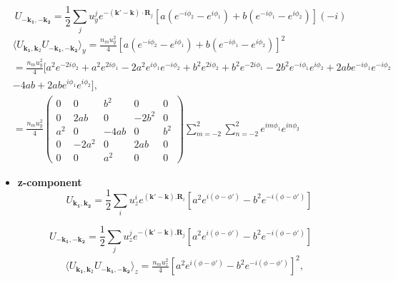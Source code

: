 \documentclass[aps,prb,amsmath,amssymb,footinbib,showpacs,twocolumn]{revtex4-2}
\begin{document}
\begin{widetext}
\begin{equation}
\end{equation}
\begin{equation}
     U_{\mathbf{-k_{1},-k_{2}}}   = \frac{1}{2}\sum_{j}u^{j}_{y}e^{-(\mathbf{k'-k})\cdot\mathbf{R}_{j}}\left[a(e^{-i\phi_{2}}-e^{i\phi_{1}})+b(e^{-i\phi_{1}}-e^{i\phi_{2}})\right](-i)
\end{equation}
\begin{align}
    &\langle U_{\mathbf{k_1},\mathbf{k}_{2}}U_{\mathbf{-k_1},\mathbf{-k_2}}\bigl \rangle_{y}= \frac{n_{m}u^{2}_{y}}{4}\left[a(e^{-i\phi_{2}}-e^{i\phi_{1}})+b(e^{-i\phi_{1}}-e^{i\phi_{2}})\right]^{2}\nonumber\\&
    =\frac{n_{m}u^{2}_{y}}{4}[a^{2}e^{-2i\phi_{2}}+a^{2}e^{2i\phi_{1}}-2a^{2}e^{i\phi_{1}}e^{-i\phi_{2}}+b^{2}e^{2i\phi_{2}}+b^{2}e^{-2i\phi_{1}}-2b^{2}e^{-i\phi_{1}}e^{i\phi_{2}}+2abe^{-i\phi_{1}}e^{-i\phi_{2}}\nonumber\\&
    -4ab+2abe^{i\phi_{1}}e^{i\phi_{2}}],\nonumber \\&
    = \frac{n_{m}u^{2}_{y}}{4}\begin{pmatrix}
 0 & 0 & b^{2} & 0 & 0\\
        0 & 2ab & 0 & -2b^{2} & 0 \\
        a^{2} & 0 & -4ab & 0 & b^{2} \\
        0 & -2a^{2} & 0 & 2ab & 0\\
       0 & 0 & a^{2} & 0 & 0
\end{pmatrix}\sum_{m=-2}^{2}\sum_{n=-2}^{2}e^{im\phi_{1}}e^{in\phi_{2}}
\end{align}
\begin{itemize}
    \item \textbf{z-component}
    \begin{equation}
    U_{\mathbf{k_{1},k_{2}}}    = \frac{1}{2}\sum_{i}u^{i}_{z}e^{(\mathbf{k'-k}).\mathbf{R}_{i}}\left[a^{2}e^{i(\phi-\phi')}-b^{2}e^{-i(\phi-\phi')}\right]  
    \end{equation}
\end{itemize}
\begin{equation}
     U_{\mathbf{-k_{1},-k_{2}}}    = \frac{1}{2}\sum_{j}u^{j}_{z}e^{-(\mathbf{k'-k}).\mathbf{R}_{j}}\left[a^{2}e^{i(\phi-\phi')}-b^{2}e^{-i(\phi-\phi')}\right]  
    \end{equation}
\begin{align}
      &\langle U_{\mathbf{k_1},\mathbf{k}_{2}}U_{\mathbf{-k_1},\mathbf{-k_2}}\bigl \rangle_{z}=\frac{n_{m}u^{2}_{z}}{4}[a^{2}e^{i(\phi-\phi')}-b^{2}e^{-i(\phi-\phi')}]^{2},\nonumber\\&

\end{align}
\end{widetext}
\end{document}
